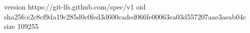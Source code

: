 version https://git-lfs.github.com/spec/v1
oid sha256:e2c8cf9da19c285d0c0fed3d600caded066fe00063ea03d557207aae3aeab04c
size 109255
